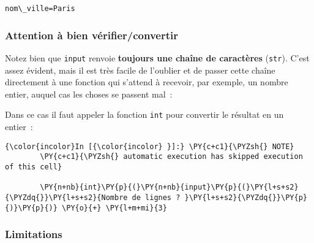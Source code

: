     \begin{Verbatim}[commandchars=\\\{\}]
nom\_ville=Paris

    \end{Verbatim}

    \hypertarget{attention-uxe0-bien-vuxe9rifierconvertir}{%
\subsubsection{Attention à bien
vérifier/convertir}\label{attention-uxe0-bien-vuxe9rifierconvertir}}

    Notez bien que \texttt{input} renvoie \textbf{toujours une chaîne de
caractères} (\texttt{str}). C'est assez évident, mais il est très facile
de l'oublier et de passer cette chaîne directement à une fonction qui
s'attend à recevoir, par exemple, un nombre entier, auquel cas les
choses se passent mal~:

    \begin{Shaded}
\begin{Highlighting}[]
\OperatorTok{>>>} \NormalTok{(}\NormalTok{) }\OperatorTok{+} 
\NormalTok{, } \OperatorTok{<}\OperatorTok{>}
\NormalTok{, } 
\end{Highlighting}
\end{Shaded}

    Dans ce cas il faut appeler la fonction \texttt{int} pour convertir le
résultat en un entier~:

    \begin{Verbatim}[commandchars=\\\{\}]
{\color{incolor}In [{\color{incolor} }]:} \PY{c+c1}{\PYZsh{} NOTE}
        \PY{c+c1}{\PYZsh{} automatic execution has skipped execution of this cell}
        
        \PY{n+nb}{int}\PY{p}{(}\PY{n+nb}{input}\PY{p}{(}\PY{l+s+s2}{\PYZdq{}}\PY{l+s+s2}{Nombre de lignes ? }\PY{l+s+s2}{\PYZdq{}}\PY{p}{)}\PY{p}{)} \PY{o}{+} \PY{l+m+mi}{3}
\end{Verbatim}


    \hypertarget{limitations}{%
\subsubsection{Limitations}\label{limitations}}

